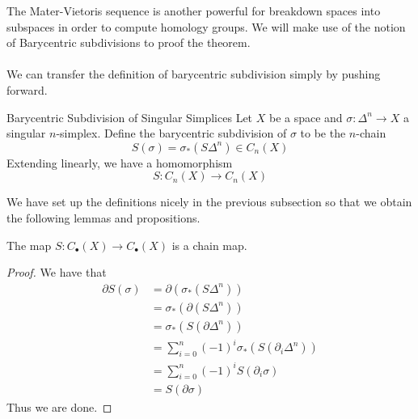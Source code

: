 \documentclass[a4paper]{article}
\begin{document}
The Mater-Vietoris sequence is another powerful for breakdown spaces into subspaces in order to compute homology groups. We will make use of the notion of Barycentric subdivisions to proof the theorem. \\~\\

We can transfer the definition of barycentric subdivision simply by pushing forward. 

\begin{defn}{Barycentric Subdivision of Singular Simplices}{} Let $X$ be a space and $\sigma:\Delta^n\to X$ a singular $n$-simplex. Define the barycentric subdivision of $\sigma$ to be the $n$-chain $$S(\sigma)=\sigma_\ast(S\Delta^n)\in C_n(X)$$ Extending linearly, we have a homomorphism $$S:C_n(X)\to C_n(X)$$
\end{defn}

We have set up the definitions nicely in the previous subsection so that we obtain the following lemmas and propositions. 

\begin{lmm}{}{} The map $S:C_\bullet(X)\to C_\bullet(X)$ is a chain map. \tcbline
\begin{proof}
We have that 
\begin{align*}
\partial S(\sigma)&=\partial(\sigma_\ast(S\Delta^n))\\
&=\sigma_\ast(\partial(S\Delta^n))\tag{$\sigma_\ast$ is a chain map}\\
&=\sigma_\ast(S(\partial\Delta^n))\tag{Lemma 4.2.4}\\
&=\sum_{i=0}^n(-1)^i\sigma_\ast(S(\partial_i\Delta^n))\\
&=\sum_{i=0}^n(-1)^iS(\partial_i\sigma)\tag{Definition of $S$}\\
&=S(\partial\sigma)
\end{align*}
Thus we are done. 
\end{proof}
\end{lmm}
\end{document}
